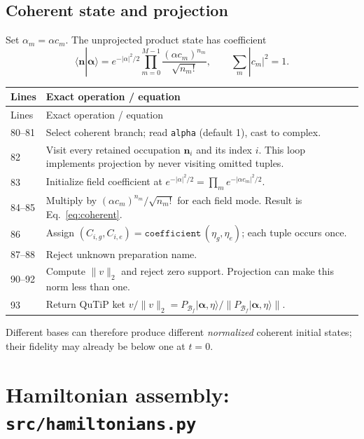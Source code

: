 \documentclass[11pt,a4paper]{article}
\newcommand{\ket}[1]{\lvert #1\rangle}
\newcommand{\code}[1]{\nolinkurl{#1}}
\newcommand{\Bf}{\mathcal B_f}
\begin{document}
\subsection{Coherent state and projection}

Set $\alpha_m=\alpha c_m$. The unprojected product state has coefficient
\begin{equation}
\langle\mathbf n|\boldsymbol\alpha\rangle
=e^{-|\alpha|^2/2}
\prod_{m=0}^{M-1}\frac{(\alpha c_m)^{n_m}}{\sqrt{n_m!}},
\qquad \sum_m|c_m|^2=1.
\label{eq:coherent}
\end{equation}
\begin{longtable}{p{}p{}}
\toprule Lines & Exact operation / equation\\\midrule\endfirsthead
\toprule Lines & Exact operation / equation\\\midrule\endhead
80--81 & Select coherent branch; read \code{alpha} (default 1), cast to complex.\\
82 & Visit every retained occupation $\mathbf n_i$ and its index $i$. This loop implements projection by never visiting omitted tuples.\\
83 & Initialize field coefficient at $e^{-|\alpha|^2/2}=\prod_m e^{-|\alpha c_m|^2/2}$.\\
84--85 & Multiply by $(\alpha c_m)^{n_m}/\sqrt{n_m!}$ for each field mode. Result is Eq.~\eqref{eq:coherent}.\\
86 & Assign $(C_{i,g},C_{i,e})=\texttt{coefficient}\,(\eta_g,\eta_e)$; each tuple occurs once.\\
87--88 & Reject unknown preparation name.\\
90--92 & Compute $\|v\|_2$ and reject zero support. Projection can make this norm less than one.\\
93 & Return QuTiP ket $v/\|v\|_2=P_{\Bf}\ket{\boldsymbol\alpha,\eta}/\|P_{\Bf}\ket{\boldsymbol\alpha,\eta}\|$.\\
\bottomrule
\end{longtable}
Different bases can therefore produce different \emph{normalized} coherent
initial states; their fidelity may already be below one at $t=0$.

\section{Hamiltonian assembly: \code{src/hamiltonians.py}}
\end{document}
